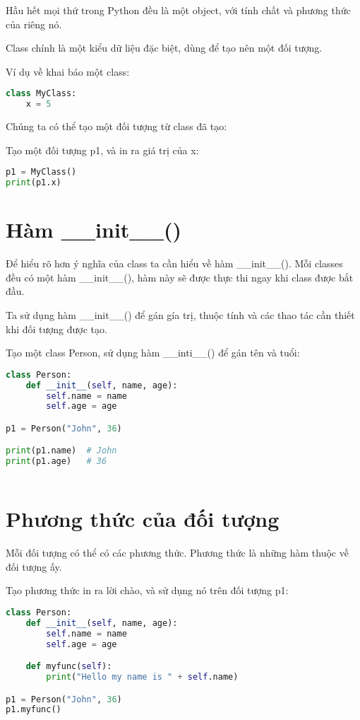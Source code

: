 \documentclass[../main-report.tex]{subfiles}
\begin{document}
Hầu hết mọi thứ trong Python đều là một object, với tính chất và phương thức của riêng nó.

Class chính là một kiểu dữ liệu đặc biệt, dùng để tạo nên một đối tượng.
\begin{example}
Ví dụ về khai báo một class:
\begin{lstlisting}[language=Python]
class MyClass:
    x = 5
\end{lstlisting}
\end{example}

Chúng ta có thể tạo một đối tượng từ class đã tạo:
\begin{example}
Tạo một đối tượng p1, và in ra giá trị của x:
\begin{lstlisting}[language=Python]
p1 = MyClass()
print(p1.x)
\end{lstlisting}
\end{example}

\section*{Hàm \_\_init\_\_()}
Để hiểu rõ hơn ý nghĩa của class ta cần hiểu về hàm \_\_init\_\_(). Mỗi classes đều có một hàm \_\_init\_\_(), hàm này sẽ được thực thi ngay khi class được bắt đầu.

Ta sử dụng hàm \_\_init\_\_() để gán gía trị, thuộc tính và các thao tác cần thiết khi đối tượng được tạo.
\begin{example}
Tạo một class Person, sử dụng hàm \_\_inti\_\_() để gán tên và tuổi:
\begin{lstlisting}[language=Python]
class Person:
    def __init__(self, name, age):
        self.name = name
        self.age = age

p1 = Person("John", 36)

print(p1.name)  # John
print(p1.age)   # 36
  
\end{lstlisting}
\end{example}

\section*{Phương thức của đối tượng}
Mỗi đối tượng có thể có các phương thức. Phương thức là những hàm thuộc về đối tượng ấy.

\begin{example}
Tạo phương thức in ra lời chào, và sử dụng nó trên đối tượng p1:
\begin{lstlisting}[language=Python]
class Person:
    def __init__(self, name, age):
        self.name = name
        self.age = age

    def myfunc(self):
        print("Hello my name is " + self.name)

p1 = Person("John", 36)
p1.myfunc()
\end{lstlisting}
\end{example}
\end{document}
